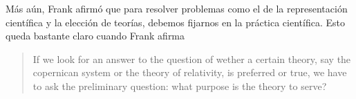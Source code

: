





Más aún, Frank afirmó que para resolver problemas como el de la representación científica y la elección de teorías, debemos fijarnos en la práctica científica. Esto queda bastante claro cuando Frank afirma

	\begin{quote}
	
	If we look for an answer to the question of wether a certain theory, say
	the copernican system or the theory of relativity, is preferred or true,
	we have to ask the preliminary question: what purpose is the theory to
	serve? \parencite[p. 15]{Frank1954} 

	\end{quote}

